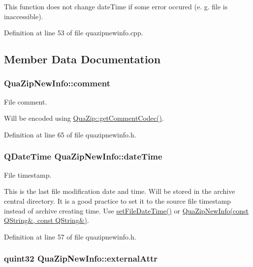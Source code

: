 This function does not change date\-Time if some error occured (e. g. file is inaccessible). 

Definition at line 53 of file quazipnewinfo.\-cpp.



\subsection{Member Data Documentation}
\hypertarget{struct_qua_zip_new_info_ae24b1d38c3550b4724862ffcf8f20924}{
\subsubsection[{comment}]{ Qua\-Zip\-New\-Info\-::comment}}\label{struct_qua_zip_new_info_ae24b1d38c3550b4724862ffcf8f20924}


File comment. 

Will be encoded using \hyperlink{class_qua_zip_a25a8d6963e62eaff007569001e8715c4}{Qua\-Zip\-::get\-Comment\-Codec()}. 

Definition at line 65 of file quazipnewinfo.\-h.

\hypertarget{struct_qua_zip_new_info_aec7f3ac72c72a2e10b82ad64c2fa3453}{
\subsubsection[{date\-Time}]{\setlength{\rightskip}{0pt plus 5cm}Q\-Date\-Time Qua\-Zip\-New\-Info\-::date\-Time}}\label{struct_qua_zip_new_info_aec7f3ac72c72a2e10b82ad64c2fa3453}


File timestamp. 

This is the last file modification date and time. Will be stored in the archive central directory. It is a good practice to set it to the source file timestamp instead of archive creating time. Use \hyperlink{struct_qua_zip_new_info_a2b18b554d056877a2f33ffb9d241ed85}{set\-File\-Date\-Time()} or \hyperlink{struct_qua_zip_new_info_ad47cf11f4277edcb09a8ba2b2963f2a9}{Qua\-Zip\-New\-Info(const Q\-String\&, const Q\-String\&)}. 

Definition at line 57 of file quazipnewinfo.\-h.

\hypertarget{struct_qua_zip_new_info_affd1a9700d302e1395bd04f0864da7d0}{
\subsubsection[{external\-Attr}]{\setlength{\rightskip}{0pt plus 5cm}quint32 Qua\-Zip\-New\-Info\-::external\-Attr}}\label{struct_qua_zip_new_info_affd1a9700d302e1395bd04f0864da7d0}


